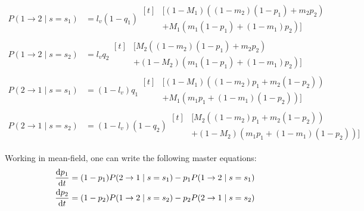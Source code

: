 \documentclass[../thesis.tex]{subfiles}
\begin{document}
\begin{equation}
    \label{eq:final_trans_probs}
    \begin{aligned}
        P(1 \rightarrow 2 \mid s = s_1)
            &= l_v (1 - q_1)
            \begin{aligned}[t]
            &[(1 - M_1) ((1 - m_2) (1 - p_1) + m_2 p_2)
            \\
            & + M_1 (m_1 (1 - p_1) + (1 - m_1) p_2)]
            \end{aligned}
        \\
        P(1 \rightarrow 2 \mid s = s_2)
            &= l_v q_2
            \begin{aligned}[t]
                &[M_2 ((1 - m_2) (1 - p_1) + m_2 p_2)
                \\
                &+ (1 - M_2) (m_1 (1 - p_1) + (1 - m_1) p_2)]
            \end{aligned}
        \\
        P(2 \rightarrow 1 \mid s = s_1)
            &= (1 - l_v) q_1
            \begin{aligned}[t]
                &[(1 - M_1) ((1 - m_2) p_1 + m_2 (1 - p_2))
                \\
                &+ M_1 (m_1 p_1 + (1 - m_1) (1 - p_2))]
            \end{aligned}
        \\
        P(2 \rightarrow 1 \mid s = s_2)
            &= (1 - l_v) (1 - q_2)
            \begin{aligned}[t]
                &[M_2 ((1 - m_2) p_1 + m_2 (1 - p_2))
                \\
                &+ (1 - M_2) (m_1 p_1 + (1 - m_1) (1 - p_2))]
            \end{aligned}
    \end{aligned}
\end{equation}

Working in mean-field, one can write the following master equations:
\begin{equation}
    \label{eq:time_evol}
    \begin{aligned}
        \dv{p_1}{t} 
            &= (1 - p_1) P(2 \rightarrow 1 \mid s = s_1)
                - p_1 P(1 \rightarrow 2 \mid s = s_1)
        \\
        \dv{p_2}{t} 
            &= (1 - p_2) P(1 \rightarrow 2 \mid s = s_2)
                 - p_2 P(2 \rightarrow 1 \mid s = s_2)
    \end{aligned}
\end{equation}
\end{document}
